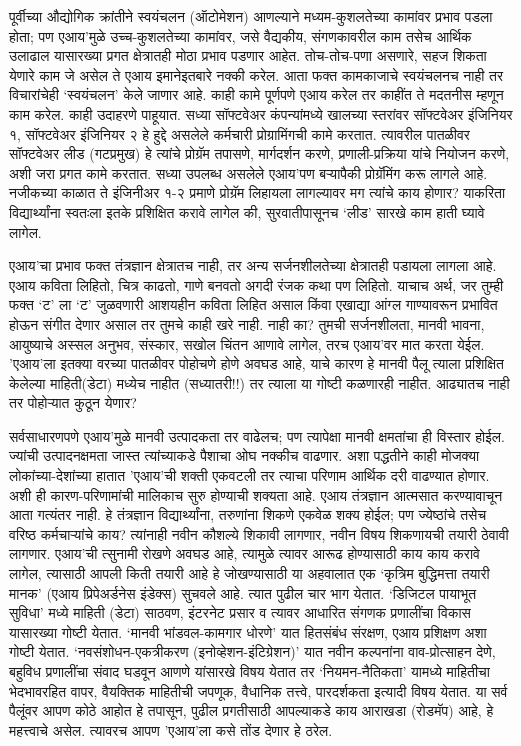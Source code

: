 पूर्वीच्या औद्योगिक क्रांतीने स्वयंचलन (ऑटोमेशन) आणल्याने मध्यम-कुशलतेच्या कामांवर प्रभाव पडला होता; पण एआय'मुळे उच्च-कुशलतेच्या कामांवर, जसे वैद्यकीय, संगणकावरील काम तसेच आर्थिक उलाढाल यासारख्या प्रगत क्षेत्रातही मोठा प्रभाव पडणार आहेत. तोच-तोच-पणा असणारे, सहज शिकता येणारे काम जे असेल ते एआय इमानेइतबारे नक्की करेल. आता फक्त कामकाजाचे स्वयंचलनच नाही तर विचारांचेही `स्वयंचलन' केले जाणार आहे. काही कामे पूर्णपणे एआय करेल तर काहींत ते मदतनीस म्हणून काम करेल. काही उदाहरणे पाहूयात. सध्या सॉफ्टवेअर कंपन्यांमध्ये खालच्या  स्तरांवर  सॉफ्टवेअर इंजिनियर १, सॉफ्टवेअर इंजिनियर २ हे हुद्दे असलेले कर्मचारी प्रोग्रामिंगची कामे करतात. त्यावरील पातळीवर सॉफ्टवेअर लीड (गटप्रमुख) हे त्यांचे प्रोग्रॅम तपासणे, मार्गदर्शन करणे, प्रणाली-प्रक्रिया यांचे नियोजन करणे, अशी जरा प्रगत कामे करतात. सध्या उपलब्ध असलेले एआय'पण बऱ्यापैकी प्रोग्रॅमिंग करू लागले आहे. नजीकच्या काळात ते इंजिनीअर १-२ प्रमाणे प्रोग्रॅम लिहायला लागल्यावर मग त्यांचे काय होणार? याकरिता विद्यार्थ्यांना स्वतःला इतके प्रशिक्षित करावे लागेल की, सुरवातीपासूनच `लीड' सारखे काम हाती घ्यावे लागेल.

एआय'चा प्रभाव फक्त तंत्रज्ञान क्षेत्रातच नाही, तर अन्य सर्जनशीलतेच्या क्षेत्रातही पडायला लागला आहे. एआय कविता लिहितो, चित्र काढतो, गाणे बनवतो अगदी रंजक कथा पण लिहितो. याचाच अर्थ, जर तुम्ही फक्त `ट' ला `ट' जुळवणारी आशयहीन कविता लिहित असाल किंवा एखाद्या आंग्ल गाण्यावरून प्रभावित होऊन संगीत देणार असाल तर तुमचे काही खरे नाही. नाही का? तुमची सर्जनशीलता, मानवी भावना, आयुष्याचे अस्सल अनुभव, संस्कार, सखोल चिंतन आणावे लागेल, तरच एआय'वर मात करता येईल. 'एआय'ला इतक्या वरच्या पातळीवर पोहोचणे होणे अवघड आहे, याचे कारण हे मानवी पैलू त्याला प्रशिक्षित केलेल्या माहिती(डेटा) मध्येच नाहीत (सध्यातरी!!) तर त्याला या गोष्टी कळणारही नाहीत. आढ्यातच नाही तर पोहोऱ्यात कुठून येणार?

सर्वसाधारणपणे एआय'मुळे मानवी उत्पादकता तर वाढेलच; पण त्यापेक्षा मानवी क्षमतांचा ही विस्तार होईल. ज्यांची उत्पादनक्षमता जास्त त्यांच्याकडे पैशाचा ओघ नक्कीच वाढणार. अशा पद्धतीने काही मोजक्या लोकांच्या-देशांच्या हातात 'एआय'ची शक्ती एकवटली तर त्याचा परिणाम आर्थिक दरी वाढण्यात होणार. अशी ही कारण-परिणामांची मालिकाच सुरु होण्याची शक्यता आहे. एआय तंत्रज्ञान आत्मसात करण्यावाचून आता गत्यंतर नाही. हे तंत्रज्ञान विद्यार्थ्यांना, तरुणांना शिकणे एकवेळ शक्य होईल; पण ज्येष्ठांचे तसेच वरिष्ठ कर्मचाऱ्यांचे काय? त्यांनाही नवीन कौशल्ये शिकावी लागणार, नवीन विषय शिकणायची तयारी ठेवावी लागणार.  एआय'ची त्सुनामी रोखणे अवघड आहे, त्यामुळे त्यावर आरूढ होण्यासाठी काय काय करावे लागेल, त्यासाठी आपली किती तयारी आहे हे जोखण्यासाठी या अहवालात एक `कृत्रिम बुद्धिमत्ता तयारी मानक' (एआय प्रिपेअर्डनेस इंडेक्स) सुचवले आहे. त्यात पुढील चार भाग येतात. `डिजिटल पायाभूत सुविधा' मध्ये माहिती (डेटा) साठवण, इंटरनेट प्रसार व त्यावर आधारित संगणक प्रणालींचा विकास यासारख्या गोष्टी येतात. `मानवी भांडवल-कामगार धोरणे' यात हितसंबंध संरक्षण, एआय प्रशिक्षण अशा गोष्टी येतात. `नवसंशोधन-एकत्रीकरण (इनोव्हेशन-इंटिग्रेशन)' यात नवीन कल्पनांना वाव-प्रोत्साहन देणे, बहुविध प्रणालींचा संवाद घडवून आणणे यांसारखे विषय येतात तर `नियमन-नैतिकता' यामध्ये माहितीचा भेदभावरहित वापर, वैयक्तिक माहितीची जपणूक, वैधानिक तत्त्वे, पारदर्शकता इत्यादी विषय येतात. या सर्व पैलूंवर आपण कोठे आहोत हे तपासून, पुढील प्रगतीसाठी आपल्याकडे काय आराखडा (रोडमॅप) आहे, हे महत्त्वाचे असेल. त्यावरच आपण 'एआय'ला कसे तोंड देणार हे ठरेल.

